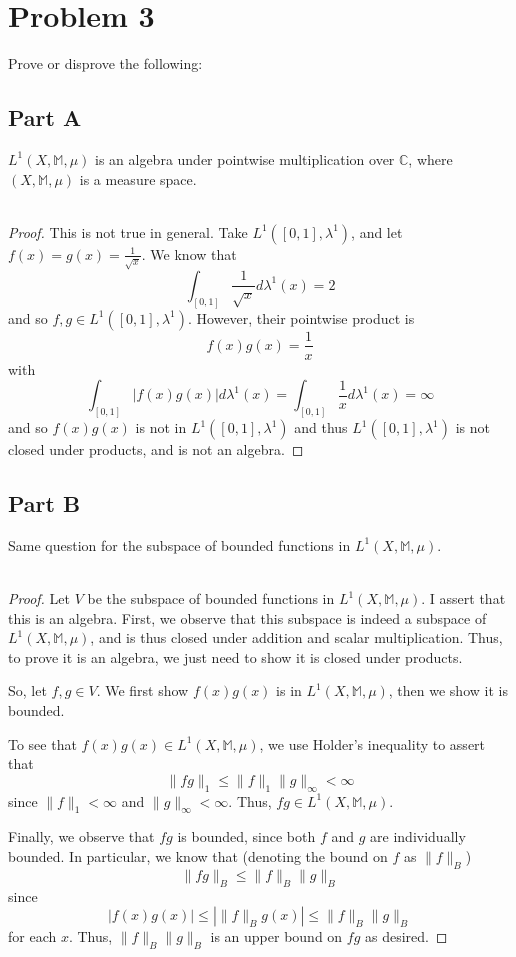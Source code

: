 \documentclass[fontsize=11pt]{scrartcl} %
\numberwithin{equation}{section} %
\numberwithin{figure}{section} %
\numberwithin{table}{section} %
\newcommand{\C}{\mathbb{C}}
\begin{document}
\newpage
\section*{Problem 3}
Prove or disprove the following:
\subsection*{Part A}
$L^1(X,\mathbb{M},\mu)$ is an algebra under pointwise multiplication over $\C$,
where $(X,\mathbb{M},\mu)$ is a measure space.
\\
\\
\begin{proof}
    This is not true in general. Take $L^1([0,1],\lambda^1)$, and let $f(x) =
    g(x) = \frac{1}{\sqrt{x}}$. We know that
    \[
        \int_{[0,1]}\frac{1}{\sqrt{x}}d\lambda^1(x) = 2
    \]
    and so $f,g\in L^1([0,1],\lambda^1)$. However, their pointwise product is
    \[
        f(x)g(x) = \frac{1}{x}
    \]
    with
    \[
        \int_{[0,1]}|f(x)g(x)|d\lambda^1(x) =
        \int_{[0,1]}\frac{1}{x}d\lambda^1(x) = \infty
    \]
    and so $f(x)g(x)$ is not in $L^1([0,1],\lambda^1)$ and thus
    $L^1([0,1],\lambda^1)$ is not closed under products, and is not an algebra.
\end{proof}

\subsection*{Part B}
Same question for the subspace of bounded functions in $L^1(X,\mathbb{M},\mu)$.
\\
\\
\begin{proof}
    Let $V$ be the subspace of bounded functions in $L^1(X,\mathbb{M},\mu)$. I
    assert that this is an algebra. First, we observe that this subspace is
    indeed a subspace of $L^1(X,\mathbb{M},\mu)$, and is thus closed under
    addition and scalar multiplication. Thus, to prove it is an algebra, we just
    need to show it is closed under products.

    So, let $f,g\in V$. We first show $f(x)g(x)$ is in $L^1(X,\mathbb{M},\mu)$,
    then we show it is bounded.

    To see that $f(x)g(x)\in L^1(X,\mathbb{M},\mu)$, we use Holder's inequality
    to assert that
    \[
        \|fg\|_1 \leq \|f\|_1\|g\|_{\infty} < \infty
    \]
    since $\|f\|_1<\infty$ and $\|g\|_{\infty}<\infty$. Thus, $fg\in
    L^1(X,\mathbb{M},\mu)$.

    Finally, we observe that $fg$ is bounded, since both $f$ and $g$ are
    individually bounded. In particular, we know that (denoting the bound on $f$
    as $\|f\|_B$)
    \[
        \|fg\|_B \leq \|f\|_B\|g\|_B
    \]
    since
    \[
        |f(x)g(x)| \leq |\|f\|_Bg(x)|\leq \|f\|_B\|g\|_B
    \]
    for each $x$. Thus, $\|f\|_B\|g\|_B$ is an upper bound on $fg$ as desired.
\end{proof}
\end{document}
